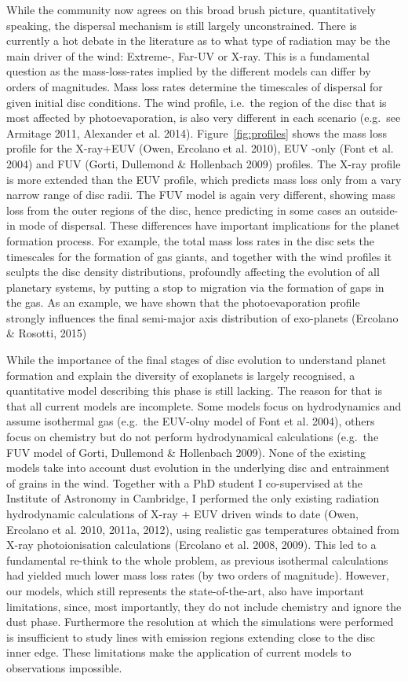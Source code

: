 \documentclass[10pt,fleqn,twoside]{article}
\begin{document}
While the community now agrees on this broad brush picture,
quantitatively speaking, the dispersal mechanism is still largely
unconstrained. There is currently a hot debate in the literature as to
what type of radiation may be the main driver of the wind: Extreme-,
Far-UV or X-ray. This is a fundamental question as the mass-loss-rates
implied by the different models can differ by orders of
magnitudes. Mass loss rates determine the timescales of dispersal for
given initial disc conditions. The wind profile, i.e.\ the region of
the disc that is most affected by photoevaporation, is also very
different in each scenario (e.g.\ see Armitage 2011, Alexander et
al. 2014). Figure~\ref{fig:profiles} shows the mass loss profile for the X-ray+EUV
(Owen, Ercolano et al. 2010), EUV -only (Font et al. 2004) and FUV
(Gorti, Dullemond \& Hollenbach 2009) profiles. The X-ray profile is
more extended than the EUV profile, which predicts mass loss only from
a vary narrow range of disc radii. The FUV model is again very
different, showing mass loss from the outer regions of the disc, hence
predicting in some cases an outside-in mode of dispersal. These
differences have important implications for the planet formation
process. For example, the total
mass loss rates in the disc sets the timescales for the formation of
gas giants, and together with the wind
profiles it sculpts the disc density distributions, profoundly affecting
the evolution of all planetary systems, by putting a stop to migration via
the formation of gaps in the gas. As an example, we have shown that
the photoevaporation profile strongly influences the final semi-major
axis distribution of exo-planets (Ercolano \& Rosotti, 2015) 

While the importance of the final stages
of disc evolution to understand planet formation and explain the
diversity of exoplanets is largely recognised, a quantitative model describing this phase is
still lacking. The reason for that is that all current models are
incomplete. Some models focus on hydrodynamics and 
assume isothermal gas (e.g.\ the EUV-olny model of Font et al. 2004), others focus on
chemistry but do not perform hydrodynamical calculations (e.g.\ the FUV
model of Gorti,
Dullemond \& Hollenbach 2009). None of the existing models take into
account dust evolution in the underlying disc and entrainment of
grains in the wind. Together with a PhD student I co-supervised
at the Institute of Astronomy in Cambridge, I performed
the only existing radiation hydrodynamic calculations of X-ray  + EUV driven
winds to date (Owen, Ercolano et al. 2010, 2011a, 2012), using realistic gas
temperatures obtained from X-ray photoionisation calculations
(Ercolano et al. 2008, 2009). This led to a fundamental re-think to the
whole problem, as previous isothermal calculations had yielded much
lower mass loss rates (by two orders of magnitude). However, our
models, which still represents the state-of-the-art, also have
important limitations, since, most importantly, they do not include
chemistry and ignore the dust phase. Furthermore the resolution at
which the simulations were performed is insufficient to study lines with
emission regions extending close to the disc inner edge. These
limitations make the application of current models to observations
impossible.  
\end{document}
